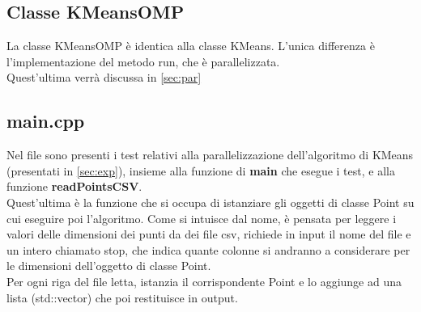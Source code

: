 \documentclass[10pt,twocolumn,letterpaper]{article}
\begin{document}
\subsection{Classe KMeansOMP}
La classe KMeansOMP è identica alla classe KMeans. L'unica differenza è l'implementazione del metodo run, che è parallelizzata.\\
Quest'ultima verrà discussa in \cref{sec:par}

\subsection{main.cpp}
Nel file sono presenti i test relativi alla parallelizzazione dell’algoritmo di KMeans (presentati in \cref{sec:exp}), insieme alla funzione di \textbf{main} che esegue i test, e alla funzione \textbf{readPointsCSV}.\\
Quest'ultima è la funzione che si occupa di istanziare gli oggetti di classe Point su cui eseguire poi l'algoritmo. Come si intuisce dal nome, è pensata per leggere i valori delle dimensioni dei punti da dei file csv, richiede in input il nome del file e un intero chiamato stop, che indica quante colonne si andranno a considerare per le dimensioni dell'oggetto di classe Point.\\
Per ogni riga del file letta, istanzia il corrispondente Point e lo aggiunge ad una lista (std::vector) che poi restituisce in output.
\end{document}
